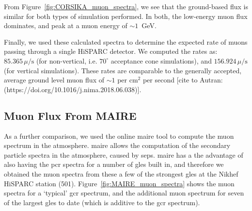 From Figure~\ref{fig:CORSIKA_muon_spectra}, we see that the ground-based flux is similar for both types of simulation performed. In both, the low-energy muon flux dominates, and peak at a muon energy of $\sim 1$~GeV.

Finally, we used these calculated spectra to determine the expected rate of muons passing through a single HiSPARC detector. We computed the rates as: $85.365 \, \mu/\mathrm{s}$ (for non-vertical, i.e. $70^\circ$ acceptance cone simulations), and $156.924 \, \mu/\mathrm{s}$ (for vertical simulations). These rates are comparable to the generally accepted, average ground level muon flux of $\sim 1$ per cm$^2$ per second [cite to Autran: (https://doi.org/10.1016/j.nima.2018.06.038)].




\subsection{Muon Flux From MAIRE}\label{sec:MAIRE_flux}

As a further comparison, we used the online \gls{maire} tool to compute the muon spectrum in the atmosphere. \gls{maire} allows the computation of the secondary particle spectra in the atmosphere, caused by \glspl{sep}. \gls{maire} has a the advantage of also having the \gls{pcr} spectra for a number of \glspl{gle} built in, and therefore we obtained the muon spectra from these a few of the strongest \glspl{gle} at the Nikhef HiSPARC station (501). Figure~\ref{fig:MAIRE_muon_spectra} shows the muon spectra for a `typical' \gls{gcr} spectrum, and the additional muon spectrum for seven of the largest \glspl{gle} to date (which is additive to the \gls{gcr} spectrum).




